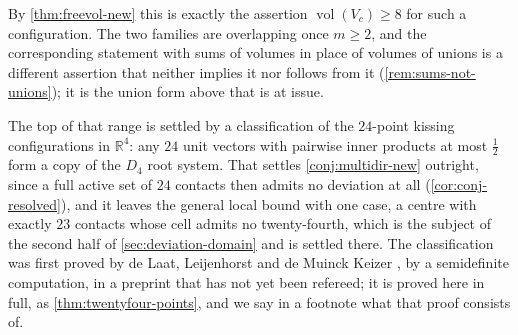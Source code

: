 \documentclass[11pt,reqno]{amsart}
\renewcommand{\_}{\origunderscore\allowbreak}
\numberwithin{equation}{section}
\theoremstyle{plain}
\theoremstyle{definition}
\theoremstyle{remark}
\DeclareMathOperator{\vol}{vol}
\begin{document}
By \cref{thm:freevol-new} this is exactly the assertion
$\vol(V_c)\ge8$ for such a configuration. The two families are
overlapping once $m\ge2$, and the corresponding statement with
sums of volumes in place of volumes of unions is a different assertion
that neither implies it nor follows from it
(\cref{rem:sums-not-unions}); it is the union form above that is at
issue.

The top of that range is settled by a classification of the $24$-point
kissing configurations in $\mathbb{R}^4$: any $24$ unit vectors with
pairwise inner products at most $\tfrac12$ form a copy of the $D_4$ root
system. That settles \cref{conj:multidir-new} outright, since a full
active set of $24$ contacts then admits no deviation at all
(\cref{cor:conj-resolved}), and it leaves the general local bound with
one case, a centre with exactly $23$ contacts whose cell admits no
twenty-fourth, which is the subject of the second half of
\cref{sec:deviation-domain} and is settled there. The classification was
first proved by de Laat, Leijenhorst and de Muinck Keizer \cite{LLM24},
by a semidefinite computation, in a preprint that has not yet been
refereed; it is proved here in full, as \cref{thm:twentyfour-points}, and
we say in a footnote what that proof consists of.%
\end{document}
